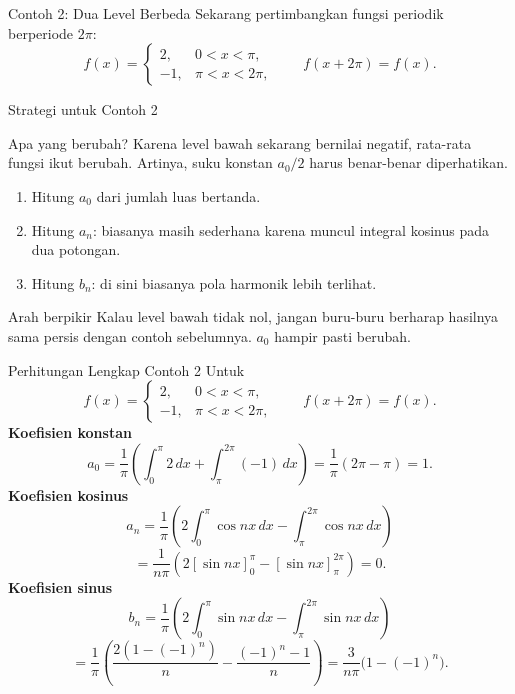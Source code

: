 \documentclass[aspectratio=169,10pt]{beamer}
\begin{document}
\begin{frame}{Contoh 2: Dua Level Berbeda}
Sekarang pertimbangkan fungsi periodik berperiode $2\pi$:
\[
f(x)=
\begin{cases}
2, & 0<x<\pi,\\
-1, & \pi<x<2\pi,
\end{cases}
\qquad f(x+2\pi)=f(x).
\]
\begin{center}
\end{center}
\end{frame}

\begin{frame}{Strategi untuk Contoh 2}
\begin{block}{Apa yang berubah?}
Karena level bawah sekarang bernilai negatif, rata-rata fungsi ikut berubah. Artinya, suku konstan \(a_0/2\) harus benar-benar diperhatikan.
\end{block}
\begin{enumerate}
  \item Hitung \(a_0\) dari jumlah luas bertanda.
  \item Hitung \(a_n\): biasanya masih sederhana karena muncul integral kosinus pada dua potongan.
  \item Hitung \(b_n\): di sini biasanya pola harmonik lebih terlihat.
\end{enumerate}
\begin{alertblock}{Arah berpikir}
Kalau level bawah tidak nol, jangan buru-buru berharap hasilnya sama persis dengan contoh sebelumnya. \(a_0\) hampir pasti berubah.
\end{alertblock}
\end{frame}


\begin{frame}{Perhitungan Lengkap Contoh 2}
\scriptsize
Untuk
\[
f(x)=\begin{cases}2,&0<x<\pi,\\ -1,&\pi<x<2\pi,
\end{cases}
\qquad f(x+2\pi)=f(x).
\]
\textbf{Koefisien konstan}
\[
a_0=\frac{1}{\pi}\left(\int_0^\pi 2\,dx+\int_\pi^{2\pi}(-1)\,dx\right)=\frac{1}{\pi}(2\pi-\pi)=1.
\]
\textbf{Koefisien kosinus}
\[
a_n=\frac{1}{\pi}\left(2\int_0^\pi\cos nx\,dx-\int_\pi^{2\pi}\cos nx\,dx\right)
\]
\[
=\frac{1}{n\pi}\left(2[\sin nx]_0^\pi-[\sin nx]_\pi^{2\pi}\right)=0.
\]
\textbf{Koefisien sinus}
\[
b_n=\frac{1}{\pi}\left(2\int_0^\pi\sin nx\,dx-\int_\pi^{2\pi}\sin nx\,dx\right)
\]
\[
=\frac{1}{\pi}\left(\frac{2(1-(-1)^n)}{n}-\frac{(-1)^n-1}{n}\right)
=\frac{3}{n\pi}\bigl(1-(-1)^n\bigr).
\]
\end{frame}
\end{document}
